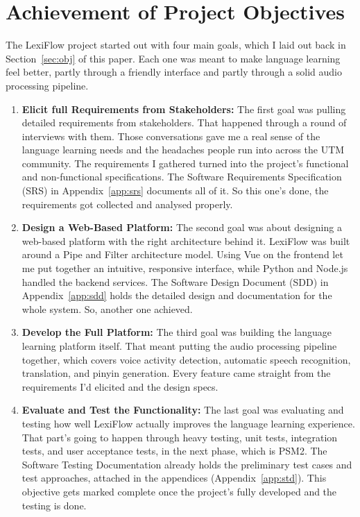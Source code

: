 \section{Achievement of Project Objectives}The LexiFlow project started out with four main goals, which I laid out back in Section~\ref{sec:obj} of this paper. Each one was meant to make language learning feel better, partly through a friendly interface and partly through a solid audio processing pipeline. \begin{enumerate}[label= (\alph*)] \item \textbf{Elicit full Requirements from Stakeholders:} The first goal was pulling detailed requirements from stakeholders. That happened through a round of interviews with them. Those conversations gave me a real sense of the language learning needs and the headaches people run into across the UTM community. The requirements I gathered turned into the project's functional and non-functional specifications. The Software Requirements Specification (SRS) in Appendix~\ref{app:srs} documents all of it. So this one's done, the requirements got collected and analysed properly. \item \textbf{Design a Web-Based Platform:} The second goal was about designing a web-based platform with the right architecture behind it. LexiFlow was built around a Pipe and Filter architecture model. Using Vue on the frontend let me put together an intuitive, responsive interface, while Python and Node.js handled the backend services. The Software Design Document (SDD) in Appendix~\ref{app:sdd} holds the detailed design and documentation for the whole system. So, another one achieved. \item \textbf{Develop the Full Platform:} The third goal was building the language learning platform itself. That meant putting the audio processing pipeline together, which covers voice activity detection, automatic speech recognition, translation, and pinyin generation. Every feature came straight from the requirements I'd elicited and the design specs. \item \textbf{Evaluate and Test the Functionality:} The last goal was evaluating and testing how well LexiFlow actually improves the language learning experience. That part's going to happen through heavy testing, unit tests, integration tests, and user acceptance tests, in the next phase, which is PSM2. The Software Testing Documentation already holds the preliminary test cases and test approaches, attached in the appendices (Appendix~\ref{app:std}). This objective gets marked complete once the project's fully developed and the testing is done.

\end{enumerate}

